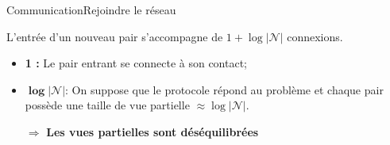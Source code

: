 \begin{frame}{Communication}{Rejoindre le réseau}

  L'entrée d'un nouveau pair s'accompagne de $1+ \log {|\mathcal{N}|}$
  connexions.

  \vspace{0.5cm}
  
  \begin{itemize}
  \item \textbf{1 :} Le pair entrant se connecte à son contact;
  \item $\pmb{\log |\mathcal{N}|}$: On suppose que le protocole répond au
    problème et chaque pair possède une taille de vue partielle
    $\approx \log |\mathcal{N}|$.
  \end{itemize}

  \vspace{1cm}

  \begin{minipage}{0.32\textwidth}
    \begin{center}
      
    \end{center}
  \end{minipage}
  \begin{minipage}{0.32\textwidth}
    \begin{center}
      
    \end{center}
  \end{minipage}
  \begin{minipage}{0.32\textwidth}
    \begin{center}
      
    \end{center}
  \end{minipage}

  \vspace{1cm}
  
  \large
  \begin{itemize}
  \item [$\Rightarrow$] \textbf{Les vues partielles sont déséquilibrées}
  \end{itemize}

\end{frame}


